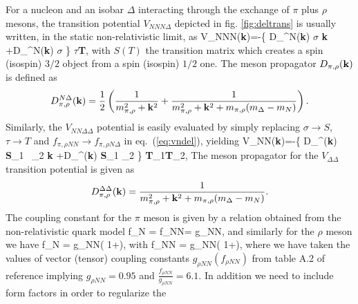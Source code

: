 For a nucleon and an isobar $\Delta$
interacting through the exchange of $\pi$ plus $\rho$ mesons,
the transition potential $V_{NNN\Delta}$ depicted in fig. \ref{fig:deltrans} 
is usually written, in the static
 non-relativistic
limit, as
\cite{ew88,tow87,mut85}
\be
V_{NNN\Delta}({\bf k})={\displaystyle -\left\{
D_{\pi}^{N\Delta}({\bf k})
\mbox{\boldmath $\sigma$} \cdot
{\bf k}
+D_{\rho}^{N\Delta}({\bf k})
\mbox{\boldmath $\sigma$}
\right\}
\mbox{\boldmath $\tau$}{\bf T},}   \label{eq:vndel}
\ee
with $S(T)$ the transition matrix which creates a spin (isospin)
$3/2$ object from a spin (isospin) $1/2$ one.
The meson propagator $D_{\pi , \rho}({\bf k})$ is defined as
\[
D_{\pi , \rho}^{N\Delta}({\bf k})=
\frac{1}{2}\left(\frac{1}{m_{\pi ,\rho}^{2}+{\bf k} ^{2} }+
\frac{1}{m_{\pi , \rho}^{2}+{\bf k} ^{2} +
m_{\pi , \rho}(m_{\Delta}-m_{N})}\right).
\]
Similarly, the $V_{NN\Delta\Delta}$ potential is easily
evaluated by simply replacing $\sigma \rightarrow S$,
$\tau\rightarrow T$
and $f_{\pi,\rho NN}\rightarrow f_{\pi,\rho N\Delta}$ in eq.\
(\ref{eq:vndel}), yielding
\be
V_{NN\Delta\Delta}({\bf k})={\displaystyle -\left\{
D_{\pi}^{\Delta\Delta}({\bf k})
{\bf S}_1 \ _2 \cdot
{\bf k}
+D_{\rho}^{\Delta\Delta}({\bf k})
{\bf S}_1 \cdot {\bf S}_2 \times {\bf k}
\right\}
{\bf T}_1{\bf T}_2,}   \label{eq:vdeldel}
\ee
The  meson propagator for the
$V_{\Delta\Delta}$ transition potential is given as
\[
D_{\pi , \rho}^{\Delta\Delta}({\bf k})=
\frac{1}{m_{\pi ,\rho}^{2}+{\bf k} ^{2}+m_{\pi ,\rho}(m_{\Delta}-m_{N})} .
\]
The coupling constant for the $\pi$
meson is given by a relation obtained from
the non-relativistic quark model \cite{bw75}
\be
f_{\pi N\Delta} = f_{\pi NN}=
\frac{6}{5}\sqrt{2}g_{\pi NN},
\ee
and similarly for the $\rho$ meson we have
\be
f_{\rho N\Delta} =
g_{\rho NN}\left(
1+\right),
\ee
with
\be
f_{\rho NN} = \sqrt{4\pi}g_{\rho NN}\left(
1+\frac{f_{\rho NN}}{g_{\rho NN}}\right),
\ee
where we have taken the values of vector (tensor) coupling constants
$g_{\rho NN}(f_{\rho NN})$ from table A.2 of reference \cite{mac89}
implying $g_{\rho NN}=0.95$ and $\frac{f_{\rho NN}}{g_{\rho NN}} =6.1$.
In addition we need to include form factors in order to regularize the
